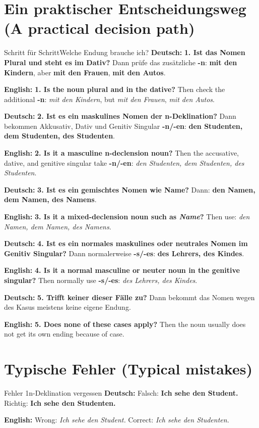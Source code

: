 \documentclass[a4paper,11pt]{article}
\newcommand{\GermanText}[1]{\textbf{Deutsch: }#1\par}
\newcommand{\EnglishText}[1]{{\small\color{SoftGray}\textbf{English: }#1\par}}
\begin{document}
\section{Ein praktischer Entscheidungsweg \textnormal{(A practical decision path)}}
\begin{grammarentry}{Schritt für Schritt}{Welche Endung brauche ich?}
\GermanText{\textbf{1. Ist das Nomen Plural und steht es im Dativ?} Dann prüfe das zusätzliche \textbf{-n}: \textbf{mit den Kindern}, aber \textbf{mit den Frauen}, \textbf{mit den Autos}.}
\EnglishText{\textbf{1. Is the noun plural and in the dative?} Then check the additional \textbf{-n}: \emph{mit den Kindern}, but \emph{mit den Frauen}, \emph{mit den Autos}.}

\GermanText{\textbf{2. Ist es ein maskulines Nomen der n-Deklination?} Dann bekommen Akkusativ, Dativ und Genitiv Singular \textbf{-n/-en}: \textbf{den Studenten, dem Studenten, des Studenten}.}
\EnglishText{\textbf{2. Is it a masculine n-declension noun?} Then the accusative, dative, and genitive singular take \textbf{-n/-en}: \emph{den Studenten, dem Studenten, des Studenten}.}

\GermanText{\textbf{3. Ist es ein gemischtes Nomen wie \glqq Name\grqq?} Dann: \textbf{den Namen, dem Namen, des Namens}.}
\EnglishText{\textbf{3. Is it a mixed-declension noun such as \emph{Name}?} Then use: \emph{den Namen, dem Namen, des Namens}.}

\GermanText{\textbf{4. Ist es ein normales maskulines oder neutrales Nomen im Genitiv Singular?} Dann normalerweise \textbf{-s/-es}: \textbf{des Lehrers, des Kindes}.}
\EnglishText{\textbf{4. Is it a normal masculine or neuter noun in the genitive singular?} Then normally use \textbf{-s/-es}: \emph{des Lehrers, des Kindes}.}

\GermanText{\textbf{5. Trifft keiner dieser Fälle zu?} Dann bekommt das Nomen wegen des Kasus meistens keine eigene Endung.}
\EnglishText{\textbf{5. Does none of these cases apply?} Then the noun usually does not get its own ending because of case.}
\end{grammarentry}

\section{Typische Fehler \textnormal{(Typical mistakes)}}
\begin{grammarentry}{Fehler 1}{n-Deklination vergessen}
\GermanText{Falsch: \textbf{Ich sehe den Student.} Richtig: \textbf{Ich sehe den Studenten.}}
\EnglishText{Wrong: \emph{Ich sehe den Student.} Correct: \emph{Ich sehe den Studenten.}}
\end{grammarentry}
\end{document}
